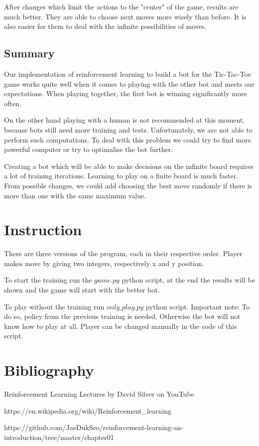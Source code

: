 \documentclass[a4paper,12pt]{book}
\begin{document}
After changes which limit the actions to the "center" of the game, results are much better. They are able to choose next moves more wisely than before. It is also easier for them to deal with the infinite possibilities of moves.

 	\section{Summary}

Our implementation of reinforcement learning to build a bot for the Tic-Tac-Toe game works quite well when it comes to playing with the other bot and meets our expectations. When playing together, the first bot is winning significantly more often. 

On the other hand playing with a human is not recommended at this moment, because bots still need more training and tests. Unfortunately, we are not able to perform such computations. To deal with this problem we could try to find more powerful computer or try to optimalise the bot further. 

Creating a bot which will be able to make decisions on the infinite board requires a lot of training iterations. Learning to play on a finite board is much faster. From possible changes, we could add choosing the best move randomly if there is more than one with the same maximum value.

	\chapter{Instruction}

There are three versions of the program, each in their respective order. Player makes move by giving two integers, respectively x and y position.

To start the training run the $game.py$ python script, at the end the results will be shown and the game will start with the better bot.

To play without the training run $only\_play.py$ python script. Important note: To do so, policy from the previous training is needed. Otherwise the bot will not know how to play at all. Player can be changed manually in the code of this script.

	\chapter{Bibliography}

\begin{description}
	\item Reinforcement Learning Lectures by David Silver on YouTube
	\item https://en.wikipedia.org/wiki/Reinforcement\_learning
	\item https://github.com/JaeDukSeo/reinforcement-learning-an-introduction/tree/master/chapter01
\end{description}


	\backmatter
	
\end{document}

